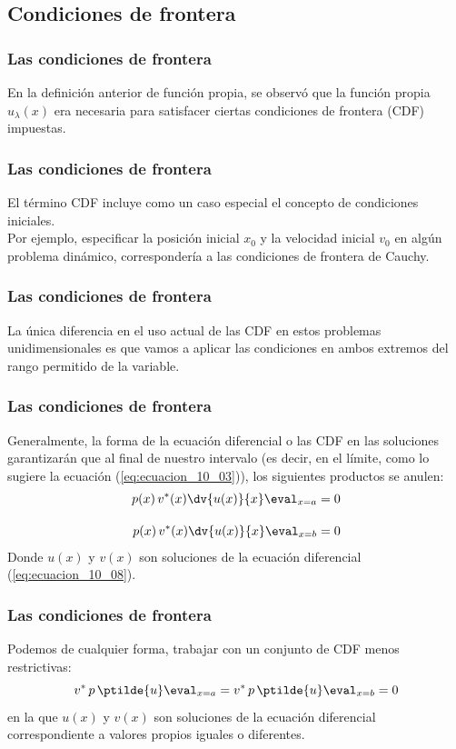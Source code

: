 \subsection{Condiciones de frontera}
\begin{frame}
\frametitle{Las condiciones de frontera}
En la definición anterior de función propia, se observó que la función propia $u_{\lambda} (x)$ era necesaria para satisfacer ciertas condiciones de frontera (CDF) impuestas. 
\end{frame}
\begin{frame}
\frametitle{Las condiciones de frontera}
El término CDF incluye como un caso especial el concepto de condiciones iniciales.
\\
\bigskip
\pause
Por ejemplo, especificar la posición inicial $x_{0}$ y la velocidad inicial $v_{0}$ en algún problema dinámico, correspondería a las condiciones de frontera de Cauchy.
\end{frame}
\begin{frame}
\frametitle{Las condiciones de frontera}
La única diferencia en el uso actual de las CDF en estos problemas unidimensionales es que vamos a aplicar las condiciones en ambos extremos del rango permitido de la variable.
\end{frame}
\begin{frame}
\frametitle{Las condiciones de frontera}
\fontsize{12}{12}\selectfont
Generalmente, la forma de la ecuación diferencial o las CDF en las soluciones garantizarán que al final de nuestro intervalo (es decir, en el límite, como lo sugiere la ecuación (\ref{eq:ecuacion_10_03})), los siguientes productos se anulen:
\begin{align}
\begin{aligned}
p(x) \, v^{*}(x) \dv{u(x)}{x} \eval_{x = a} = 0 \\[1em]
p(x) \, v^{*}(x) \dv{u(x)}{x} \eval_{x = b} = 0
\label{eq:ecuacion_10_19}
\end{aligned}
\end{align}
Donde $u(x)$ y $v(x)$ son soluciones de la ecuación diferencial (\ref{eq:ecuacion_10_08}).
\end{frame}
\begin{frame}
\frametitle{Las condiciones de frontera}
Podemos de cualquier forma, trabajar con un conjunto de CDF menos restrictivas:
\begin{equation}
v^{*} \, p \, \ptilde{u} \eval_{x = a} = v^{*} \, p \, \ptilde{u} \eval_{x = b} = 0
\label{eq:ecuacion_10_20}
\end{equation}
en la que $u(x)$ y $v(x)$ son soluciones de la ecuación diferencial correspondiente a valores propios iguales o diferentes.
\end{frame}
